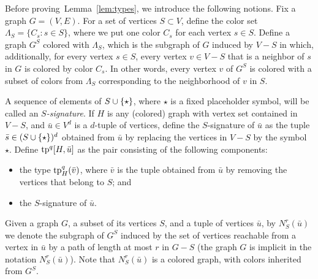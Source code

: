 Before proving~Lemma~\ref{lem:types}, we introduce the following notions.
Fix a graph $G=(V,E)$.
For a set of vertices $S\subset V$, define the color set $\Lambda_S=\{C_s\colon s\in S\}$, where we put one color $C_s$ for each vertex $s\in S$.
Define a graph $G^S$ colored with $\Lambda_S$, which is 
the subgraph of $G$ induced by $V-S$
in which, additionally, for every vertex $s\in S$, every vertex $v\in V-S$ that is a neighbor of $s$ in $G$ is colored by color $C_s$. 
In other words, every vertex $v$ of $G^S$ is colored with a subset of colors from $\Lambda_S$ corresponding to the neighborhood of $v$ in $S$.

A sequence of elements of $S\cup\{\star\}$,
where $\star$ is a fixed placeholder symbol,
will be called an \emph{$S$-signature}.
If $H$ is any (colored) graph with vertex set contained in $V-S$,
and $\bar u\in V^d$ is a $d$-tuple of vertices,
define the {$S$-signature} of $\bar u$
as the tuple $\bar s\in (S\cup\{\star\})^d$ obtained from $\bar u$ by replacing the vertices in $V-S$ by the symbol~$\star$.
Define $\mathrm{tp}^q[H,\bar u]$ as the
pair consisting of the following components:
\begin{itemize}
	\item the type $\mathrm{tp}^q_H(\bar v)$,
	where $\bar v$ is the tuple obtained from $\bar u$
	by removing the vertices that belong to $S$; and
	\item the $S$-signature of $\bar u$.
\end{itemize}

Given a graph $G$, a subset of its vertices $S$, and a tuple of vertices $\bar u$,
by $N^r_S(\bar u)$ we denote the subgraph of $G^S$ induced by the set of vertices reachable from a vertex in $\bar u$ by a path of length at most $r$
in $G-S$ (the graph $G$ is implicit in the notation $N^r_S(\bar u)$). Note that $N^r_S(\bar u)$ is a colored graph, with colors inherited from $G^S$.

